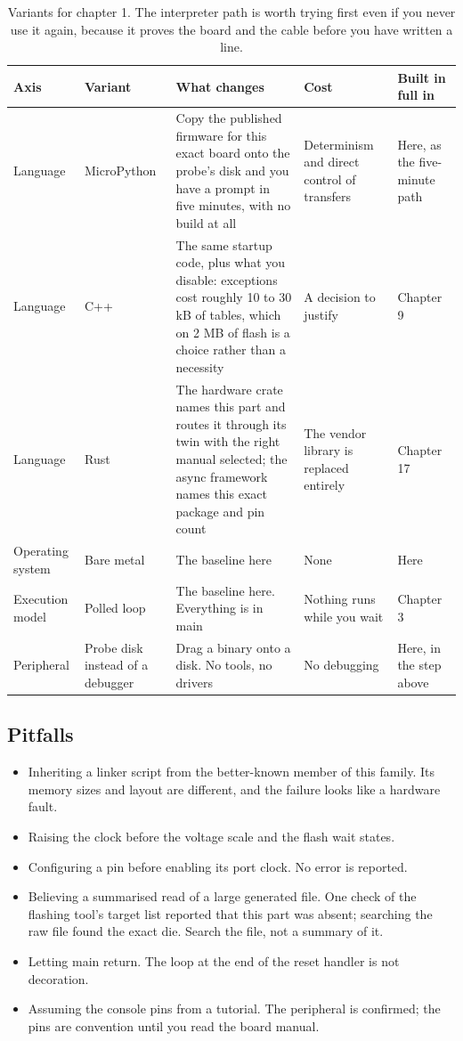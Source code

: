 \begin{table}[H]\centering\small
\begin{tabular}{p{24mm}p{26mm}p{44mm}p{22mm}p{20mm}}
\toprule
Axis & Variant & What changes & Cost & Built in full in \\
\midrule
Language & MicroPython & Copy the published firmware for this exact board onto the probe's disk and you have a prompt in five minutes, with no build at all & Determinism and direct control of transfers & Here, as the five-minute path \\
Language & C++ & The same startup code, plus what you disable: exceptions cost roughly 10 to 30 kB of tables, which on 2 MB of flash is a choice rather than a necessity & A decision to justify & Chapter 9 \\
Language & Rust & The hardware crate names this part and routes it through its twin with the right manual selected; the async framework names this exact package and pin count & The vendor library is replaced entirely & Chapter 17 \\
Operating system & Bare metal & The baseline here & None & Here \\
Execution model & Polled loop & The baseline here. Everything is in main & Nothing runs while you wait & Chapter 3 \\
Peripheral & Probe disk instead of a debugger & Drag a binary onto a disk. No tools, no drivers & No debugging & Here, in the step above \\
\bottomrule
\end{tabular}
\caption{Variants for chapter 1. The interpreter path is worth trying first even if you never use it again, because it proves the board and the cable before you have written a line.}
\end{table}

\subsection*{Pitfalls}

\begin{itemize}
\item Inheriting a linker script from the better-known member of this family.
Its memory sizes and layout are different, and the failure looks like a hardware
fault.
\item Raising the clock before the voltage scale and the flash wait states.
\item Configuring a pin before enabling its port clock. No error is reported.
\item Believing a summarised read of a large generated file. One check of the
flashing tool's target list reported that this part was absent; searching the
raw file found the exact die. Search the file, not a summary of it.
\item Letting main return. The loop at the end of the reset handler is not
decoration.
\item Assuming the console pins from a tutorial. The peripheral is confirmed;
the pins are convention until you read the board manual.
\end{itemize}

